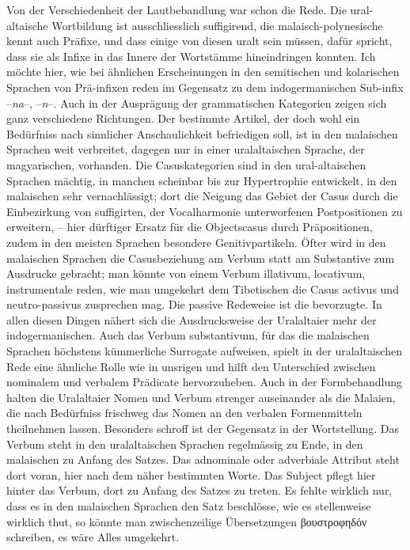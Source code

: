 Von der Verschiedenheit der Lautbebandlung war schon die Rede. Die ural-altaische Wortbildung ist ausschliesslich suffigirend, die malaisch-polynesische kennt auch Präfixe, und dass einige von diesen uralt sein müssen, dafür spricht, dass sie als Infixe in das Innere der Wortstämme hineindringen konnten. Ich möchte hier, wie bei ähnlichen Erscheinungen in den semitischen und kolarischen Sprachen von Prä-infixen reden im Gegensatz zu dem indogermanischen Sub-infix –\textit{na}–, –\textit{n}–. Auch in der Ausprägung der grammatischen Kategorien zeigen sich ganz verschiedene Richtungen. Der bestimmte Artikel, der doch wohl ein Bedürfniss nach sinnlicher Anschaulichkeit befriedigen soll, ist in den malaischen Sprachen weit verbreitet, dagegen nur in einer uralaltaischen Sprache, der magyarischen, vorhanden. Die Casuskategorien sind in den ural-altaischen Sprachen mächtig, in manchen scheinbar bis zur Hypertrophie entwickelt, in den malaischen sehr vernachlässigt; dort die Neigung das Gebiet der Casus durch die Einbezirkung von suffigirten, der Vocalharmonie unterworfenen Postpositionen zu erweitern, – hier dürftiger Ersatz für die Objectscasus durch Prä\label{sp.416}positionen, zudem in den meisten Sprachen besondere Genitivpartikeln. Öfter wird in den malaischen Sprachen die Casusbeziehung am Verbum statt am Substantive zum Ausdrucke gebracht; man könnte von einem Verbum illativum, locativum, instrumentale reden, wie man umgekehrt dem Tibetischen die Casus activus und neutro-passivus zusprechen mag. Die passive Redeweise ist die bevorzugte. In allen diesen Dingen nähert sich die Ausdrucksweise der Uralaltaier mehr der indogermanischen. Auch das Verbum substantivum, für das die malaischen Sprachen höchstens kümmerliche Surrogate aufweisen, spielt in der uralaltaischen Rede eine ähnliche Rolle wie in  unsrigen und hilft den Unterschied zwischen nominalem und verbalem Prädicate hervorzuheben. Auch in der Formbehandlung halten die Uralaltaier Nomen und Verbum strenger auseinander als die Malaien, die nach Bedürfniss frischweg das Nomen an den verbalen Formenmitteln theilnehmen lassen. Besonders schroff ist der Gegensatz in der Wortstellung. Das Verbum steht in den uralaltaischen Sprachen regelmässig zu Ende, in den malaischen  zu Anfang des Satzes.  Das adnominale oder adverbiale Attribut steht dort voran, hier nach dem näher bestimmten Worte. Das Subject pflegt hier hinter das Verbum, dort zu Anfang des \label{fp.395} Satzes zu treten. Es fehlte wirklich nur, dass es in den malaischen Sprachen den Satz beschlösse, wie es stellenweise wirklich thut, so könnte man zwischenzeilige Übersetzungen βουστροφηδόν schreiben, es wäre Alles umgekehrt. 


